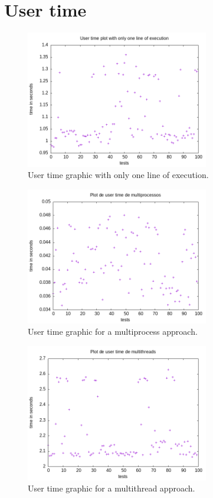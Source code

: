 \documentclass[12pt]{article}
\begin{document}
\section{User time}
    \begin{figure}[H]
        \caption{User time graphic with only one line of execution.}
        \centering
        \includegraphics[width=8cm]{doc/user_simples.png}
    \end{figure}

    \begin{figure}[H]
        \caption{User time graphic for a multiprocess approach.}
        \centering
        \includegraphics[width=8cm]{doc/user_processos.png}
    \end{figure}

    \begin{figure}[H]
        \caption{User time graphic for a multithread approach.}
        \centering
        \includegraphics[width=8cm]{doc/user_threads.png}
    \end{figure}
\end{document}
